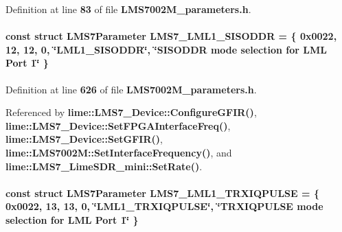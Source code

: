 Definition at line {\bf 83} of file {\bf L\+M\+S7002\+M\+\_\+parameters.\+h}.

\paragraph[{L\+M\+S7\+\_\+\+L\+M\+L1\+\_\+\+S\+I\+S\+O\+D\+DR}]{\setlength{\rightskip}{0pt plus 5cm}const struct {\bf L\+M\+S7\+Parameter} L\+M\+S7\+\_\+\+L\+M\+L1\+\_\+\+S\+I\+S\+O\+D\+DR = \{ 0x0022, 12, 12, 0, \char`\"{}\+L\+M\+L1\+\_\+\+S\+I\+S\+O\+D\+D\+R\char`\"{}, \char`\"{}\+S\+I\+S\+O\+D\+D\+R mode selection for L\+M\+L Port 1\char`\"{} \}\hspace{0.3cm}{\ttfamily [static]}}\label{LMS7002M__parameters_8h_a506b52d82c1d155397c546613262143e}


Definition at line {\bf 626} of file {\bf L\+M\+S7002\+M\+\_\+parameters.\+h}.



Referenced by {\bf lime\+::\+L\+M\+S7\+\_\+\+Device\+::\+Configure\+G\+F\+I\+R()}, {\bf lime\+::\+L\+M\+S7\+\_\+\+Device\+::\+Set\+F\+P\+G\+A\+Interface\+Freq()}, {\bf lime\+::\+L\+M\+S7\+\_\+\+Device\+::\+Set\+G\+F\+I\+R()}, {\bf lime\+::\+L\+M\+S7002\+M\+::\+Set\+Interface\+Frequency()}, and {\bf lime\+::\+L\+M\+S7\+\_\+\+Lime\+S\+D\+R\+\_\+mini\+::\+Set\+Rate()}.

\paragraph[{L\+M\+S7\+\_\+\+L\+M\+L1\+\_\+\+T\+R\+X\+I\+Q\+P\+U\+L\+SE}]{\setlength{\rightskip}{0pt plus 5cm}const struct {\bf L\+M\+S7\+Parameter} L\+M\+S7\+\_\+\+L\+M\+L1\+\_\+\+T\+R\+X\+I\+Q\+P\+U\+L\+SE = \{ 0x0022, 13, 13, 0, \char`\"{}\+L\+M\+L1\+\_\+\+T\+R\+X\+I\+Q\+P\+U\+L\+S\+E\char`\"{}, \char`\"{}\+T\+R\+X\+I\+Q\+P\+U\+L\+S\+E mode selection for L\+M\+L Port 1\char`\"{} \}\hspace{0.3cm}{\ttfamily [static]}}\label{LMS7002M__parameters_8h_a159bc50f8670683a656d5b67030815c1}


